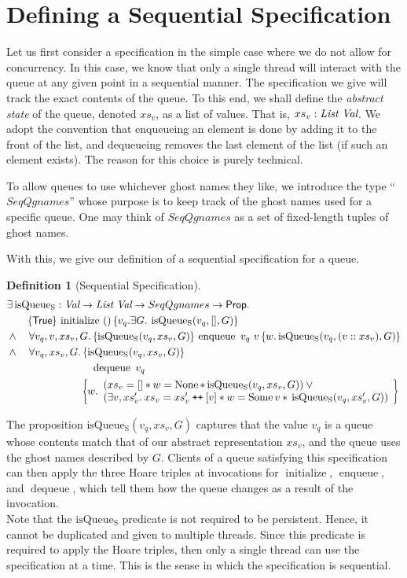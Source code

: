 \documentclass[a4paper, 10pt]{report}
\theoremstyle{definition}
\newtheorem{definition}{Definition}[section]
\newcommand{\initialise}{\operatorname{initialize}}
\newcommand{\enqueue}{\operatorname{enqueue}}
\newcommand{\dequeue}{\operatorname{dequeue}}
\newcommand{\isqueueseq}{\operatorname{isQueue_{S}}}
\newcommand{\SeqQgnames}{SeqQgnames}
\newcommand{\vq}{v_q}
\newcommand{\nodeval}{\valB}
\newcommand{\absvalue}{\val}
\newcommand{\absvalueList}{xs_v}
\newcommand{\Qg}{G}
\newcommand\catenate{\mathbin{\text{\ttfamily\upshape ++}}}
\newcommand{\seqspecinitHTGen}[2]{\hoare{\TRUE}{\initialise \ \TT}{#1 . \Exists #2. \isqueueseq(#1, [], #2)}}
\newcommand{\seqspecinitGen}[2]{\seqspecinitHTGen{#1}{#2}}
\newcommand{\seqspecinit}{\seqspecinitGen{\vq}{\Qg}}
\newcommand{\seqspecenqHT}[4]{\hoare{\isqueueseq(#1, #3, #4)}{\enqueue \ #1 \ #2}{\valB . \isqueueseq(#1, (#2 :: #3), #4)}}
\newcommand{\seqspecenqGen}[4]{\All #1, #2, #3, #4. \seqspecenqHT{#1}{#2}{#3}{#4}}
\newcommand{\seqspecenq}{\seqspecenqGen{\vq}{\absvalue}{\absvalueList}{\Qg}}
\newcommand{\seqspecdeqHT}[3]{\hoareV[t]{\isqueueseq(#1, #2, #3)}{\dequeue \ #1}{\nodeval . \begin{array}{l}(#2 = [] \star{} \nodeval = \None \star{} \isqueueseq(#1, #2, #3)) \lor{}\\ (\Exists \absvalue, #2' . #2 = #2' \catenate [\absvalue] \star{} \nodeval = \Some \absvalue \star{} \isqueueseq(#1, #2', #3)) \end{array}}}
\newcommand{\seqspecdeqGen}[3]{\All #1, #2, #3. \seqspecdeqHT{#1}{#2}{#3}}
\newcommand{\seqspecdeq}{\seqspecdeqGen{\vq}{\absvalueList}{\Qg}}
\begin{document}
\section{Defining a Sequential Specification}
\label{QueueSpecs:section:seq}

Let us first consider a specification in the simple case where we do not allow for concurrency. In this case, we know that only a single thread will interact with the queue at any given point in a sequential manner. The specification we give will track the exact contents of the queue. To this end, we shall define the \textit{abstract state} of the queue, denoted $\absvalueList$, as a list of \heaplang values. That is, $\absvalueList : \List ~ \Val$. We adopt the convention that enqueueing an element is done by adding it to the front of the list, and dequeueing removes the last element of the list (if such an element exists). The reason for this choice is purely technical.

To allow queues to use whichever ghost names they like, we introduce the type ``$\SeqQgnames$'' whose purpose is to keep track of the ghost names used for a specific queue. One may think of $\SeqQgnames$ as a set of fixed-length tuples of ghost names.

With this, we give our definition of a sequential specification for a queue.
\begin{definition}[Sequential Specification]\label{QueueSpecs:spec:seq}
\begin{align*}
  &\Exists \isqueueseq : \Val \to \List ~ \Val \to \SeqQgnames \to \Prop.\\
  &\quad\quad\seqspecinit\\
  &\land{}\quad\seqspecenq\\
  &\land{}\quad\seqspecdeq
\end{align*}
\end{definition}

The proposition $\isqueueseq(\vq, \absvalueList, \Qg)$ captures that the value $\vq$ is a queue whose contents match that of our abstract representation $\absvalueList$, and the queue uses the ghost names described by $\Qg$. Clients of a queue satisfying this specification can then apply the three Hoare triples at invocations for $\initialise$, $\enqueue$, and $\dequeue$, which tell them how the queue changes as a result of the invocation.\\
Note that the $\isqueueseq$ predicate is not required to be persistent. Hence, it cannot be duplicated and given to multiple threads. Since this predicate is required to apply the Hoare triples, then only a single thread can use the specification at a time. This is the sense in which the specification is sequential.
\end{document}
